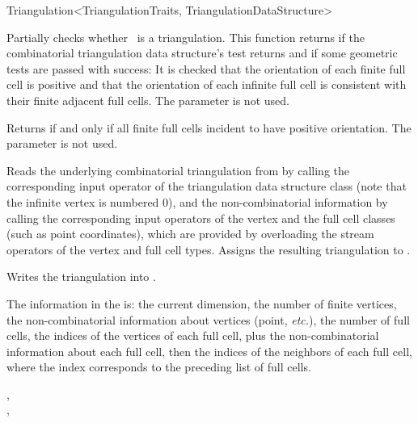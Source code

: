 \begin{ccRefClass}{Triangulation<TriangulationTraits, TriangulationDataStructure>}
\begin{ccDebug}
{Partially checks whether \ccVar\ is a triangulation. This function returns
 if the combinatorial triangulation data structure's 
test returns  and if some geometric tests are passed with success: It
is checked that the orientation of each finite full cell is positive and that
the orientation of each infinite full cell is consistent with their finite
adjacent full cells.
The  parameter is not used.%
}

 {Returns  if and only if all
finite full cells incident to  have positive orientation.
The  parameter is not used.%
}

\end{ccDebug}


{Reads the underlying combinatorial triangulation from  by
calling the corresponding input operator of the triangulation data
structure class (note that the infinite vertex is numbered 0), and the
non-combinatorial information by calling the corresponding input
operators of the vertex and the full cell classes (such as point
coordinates), which are provided by overloading the stream operators
of the vertex and full cell types. Assigns the resulting triangulation to
.}

{Writes the triangulation  into .}

The information in the  is: the current dimension, the number of
finite vertices, the non-combinatorial information about vertices (point,
\emph{etc.}), the number of full cells, the indices of the vertices of each
full cell, plus the non-combinatorial information about each full cell, then the
indices of the neighbors of each full cell, where the index corresponds to the
preceding list of full cells.

\ccSeeAlso

,\\
,\\

\end{ccRefClass}

